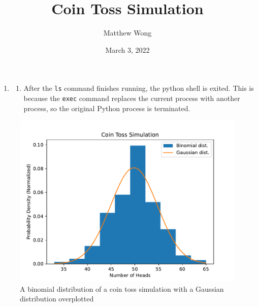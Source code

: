 \documentclass{article}
\title{Coin Toss Simulation}
\author{Matthew Wong}
\date{March 3, 2022}
\begin{document}
\maketitle

\begin{enumerate}
\item
  \begin{enumerate}
  \item
    After the \texttt{ls} command finishes running, the python shell is exited. This is because the
    \texttt{exec} command replaces the current process with another process, so the original Python
    process is terminated.
  \end{enumerate}
\end{enumerate}

\begin{figure}[!h]
  \includegraphics[width=\textwidth]{coinchart.pdf}
  \caption{A binomial distribution of a coin toss simulation with a Gaussian distribution
    overplotted}
  \centering
\end{figure}
\end{document}

